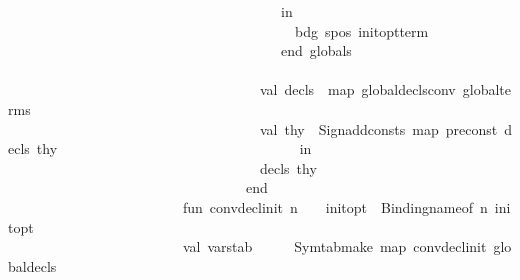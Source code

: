 \begin{isabellebody}
\ \ \ \ \ \ \ \ \ \ \ \ \ \ \ \ \ \ \ \ \ \ \ \ \ \ \ \ \ \ \ \ \ \ \ \ \ \ \ in\isanewline
\ \ \ \ \ \ \ \ \ \ \ \ \ \ \ \ \ \ \ \ \ \ \ \ \ \ \ \ \ \ \ \ \ \ \ \ \ \ \ \ \ {\isacharparenleft}{\kern0pt}{\isacharparenleft}{\kern0pt}bdg{\isacharcomma}{\kern0pt}\ {\isacharparenleft}{\kern0pt}s{\isacharcomma}{\kern0pt}pos{\isacharparenright}{\kern0pt}{\isacharparenright}{\kern0pt}{\isacharcomma}{\kern0pt}\ init{\isacharunderscore}{\kern0pt}opt{\isacharunderscore}{\kern0pt}term{\isacharparenright}{\kern0pt}\isanewline
\ \ \ \ \ \ \ \ \ \ \ \ \ \ \ \ \ \ \ \ \ \ \ \ \ \ \ \ \ \ \ \ \ \ \ \ \ \ \ end{\isacharparenright}{\kern0pt}\ globals\isanewline
\ \ \ \ \ \ \ \ \ \ \ \ \ \ \ \ \ \ \ \ \ \ \ \ \ \ \ \ \isanewline
\ \ \ \ \ \ \ \ \ \ \ \ \ \ \ \ \ \ \ \ \ \ \ \ \ \ \ \ \ \ \ \ \ \ \ \ val\ decls\ {\isacharequal}{\kern0pt}\ map\ global{\isacharunderscore}{\kern0pt}decls{\isacharunderscore}{\kern0pt}conv\ global{\isacharunderscore}{\kern0pt}terms\isanewline
\ \ \ \ \ \ \ \ \ \ \ \ \ \ \ \ \ \ \ \ \ \ \ \ \ \ \ \ \ \ \ \ \ \ \ \ val\ thy{}\ {\isacharequal}{\kern0pt}\ Sign{\isachardot}{\kern0pt}add{\isacharunderscore}{\kern0pt}consts\ {\isacharparenleft}{\kern0pt}map\ pre{\isacharunderscore}{\kern0pt}const{}\ decls{\isacharparenright}{\kern0pt}\ thy\isanewline
\ \ \ \ \ \ \ \ \ \ \ \ \ \ \ \ \ \ \ \ \ \ \ \ \ \ \ \ \ \ \ \ \ \ in\isanewline
\ \ \ \ \ \ \ \ \ \ \ \ \ \ \ \ \ \ \ \ \ \ \ \ \ \ \ \ \ \ \ \ \ \ \ \ {\isacharparenleft}{\kern0pt}decls{\isacharcomma}{\kern0pt}\ thy{}{\isacharparenright}{\kern0pt}\isanewline
\ \ \ \ \ \ \ \ \ \ \ \ \ \ \ \ \ \ \ \ \ \ \ \ \ \ \ \ \ \ \ \ \ \ end\isanewline
\isanewline
\ \ \ \ \ \ \ \ \ \ \ \ \ \ \ \ \ \ \ \ \ \ \ \ \ fun\ conv{\isacharunderscore}{\kern0pt}decl{\isacharunderscore}{\kern0pt}init\ {\isacharparenleft}{\kern0pt}n{\isacharcomma}{\kern0pt}{\isacharunderscore}{\kern0pt}{\isacharcomma}{\kern0pt}\ {\isacharunderscore}{\kern0pt}\ \ {\isacharcomma}{\kern0pt}\ init{\isacharunderscore}{\kern0pt}opt{\isacharparenright}{\kern0pt}\ {\isacharequal}{\kern0pt}\ {\isacharparenleft}{\kern0pt}Binding{\isachardot}{\kern0pt}name{\isacharunderscore}{\kern0pt}of\ n{\isacharcomma}{\kern0pt}\ init{\isacharunderscore}{\kern0pt}opt{\isacharparenright}{\kern0pt}\isanewline
\ \ \ \ \ \ \ \ \ \ \ \ \ \ \ \ \ \ \ \ \ \ \ \ \ val\ varstab\ \ \ \ \ {\isacharequal}{\kern0pt}\ Symtab{\isachardot}{\kern0pt}make\ {\isacharparenleft}{\kern0pt}map\ conv{\isacharunderscore}{\kern0pt}decl{\isacharunderscore}{\kern0pt}init\ global{\isacharunderscore}{\kern0pt}decls{\isacharprime}{\kern0pt}{\isacharparenright}{\kern0pt}\isanewline

\end{isabellebody}
